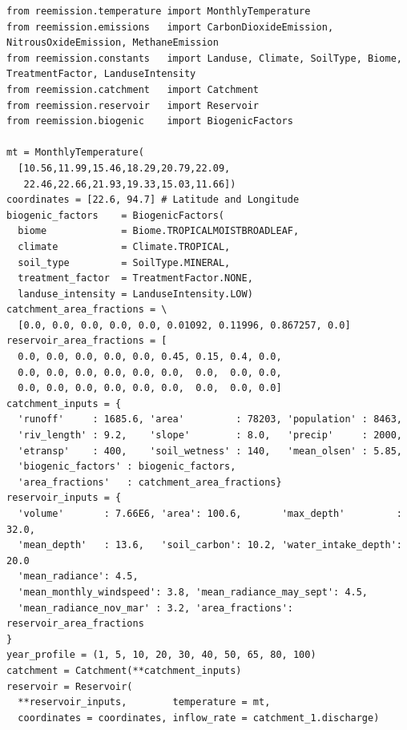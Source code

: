 \documentclass[final,1p,times]{elsarticle}
\begin{document}
\begin{minipage}{\textwidth}
\begin{lstlisting}[language=PythonReemission, label={lst:em_calc_setup}, caption={Use of Re-Emission as a library: step-by-step problem formulation.}]
from reemission.temperature import MonthlyTemperature
from reemission.emissions   import CarbonDioxideEmission, NitrousOxideEmission, MethaneEmission
from reemission.constants   import Landuse, Climate, SoilType, Biome, TreatmentFactor, LanduseIntensity
from reemission.catchment   import Catchment
from reemission.reservoir   import Reservoir
from reemission.biogenic    import BiogenicFactors

mt = MonthlyTemperature(
  [10.56,11.99,15.46,18.29,20.79,22.09,
   22.46,22.66,21.93,19.33,15.03,11.66])
coordinates = [22.6, 94.7] # Latitude and Longitude
biogenic_factors    = BiogenicFactors(
  biome             = Biome.TROPICALMOISTBROADLEAF,
  climate           = Climate.TROPICAL,
  soil_type         = SoilType.MINERAL,
  treatment_factor  = TreatmentFactor.NONE,
  landuse_intensity = LanduseIntensity.LOW)
catchment_area_fractions = \
  [0.0, 0.0, 0.0, 0.0, 0.0, 0.01092, 0.11996, 0.867257, 0.0]
reservoir_area_fractions = [
  0.0, 0.0, 0.0, 0.0, 0.0, 0.45, 0.15, 0.4, 0.0, 
  0.0, 0.0, 0.0, 0.0, 0.0, 0.0,  0.0,  0.0, 0.0, 
  0.0, 0.0, 0.0, 0.0, 0.0, 0.0,  0.0,  0.0, 0.0]
catchment_inputs = {
  'runoff'     : 1685.6, 'area'         : 78203, 'population' : 8463, 
  'riv_length' : 9.2,    'slope'        : 8.0,   'precip'     : 2000,   
  'etransp'    : 400,    'soil_wetness' : 140,   'mean_olsen' : 5.85, 
  'biogenic_factors' : biogenic_factors,
  'area_fractions'   : catchment_area_fractions}
reservoir_inputs = {
  'volume'       : 7.66E6, 'area': 100.6,       'max_depth'         : 32.0, 
  'mean_depth'   : 13.6,   'soil_carbon': 10.2, 'water_intake_depth': 20.0
  'mean_radiance': 4.5,    
  'mean_monthly_windspeed': 3.8, 'mean_radiance_may_sept': 4.5, 
  'mean_radiance_nov_mar' : 3.2, 'area_fractions': reservoir_area_fractions
}    
year_profile = (1, 5, 10, 20, 30, 40, 50, 65, 80, 100)
catchment = Catchment(**catchment_inputs)
reservoir = Reservoir(
  **reservoir_inputs,        temperature = mt,
  coordinates = coordinates, inflow_rate = catchment_1.discharge)
\end{lstlisting}
\end{minipage}
\end{document}
